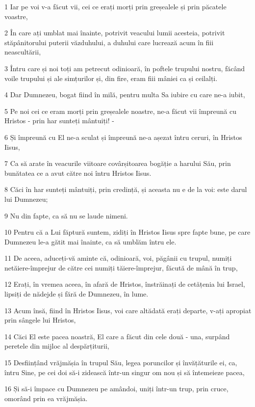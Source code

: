 \par 1 Iar pe voi v-a făcut vii, cei ce erați morți prin greșealele și prin păcatele voastre,
\par 2 În care ați umblat mai înainte, potrivit veacului lumii acesteia, potrivit stăpânitorului puterii văzduhului, a duhului care lucrează acum în fiii neascultării,
\par 3 Întru care și noi toți am petrecut odinioară, în poftele trupului nostru, făcând voile trupului și ale simțurilor și, din fire, eram fiii mâniei ca și ceilalți.
\par 4 Dar Dumnezeu, bogat fiind în milă, pentru multa Sa iubire cu care ne-a iubit,
\par 5 Pe noi cei ce eram morți prin greșealele noastre, ne-a făcut vii împreună cu Hristos - prin har sunteți mântuiți! -
\par 6 Și împreună cu El ne-a sculat și împreună ne-a așezat întru ceruri, în Hristos Iisus,
\par 7 Ca să arate în veacurile viitoare covârșitoarea bogăție a harului Său, prin bunătatea ce a avut către noi întru Hristos Iisus.
\par 8 Căci în har sunteți mântuiți, prin credință, și aceasta nu e de la voi: este darul lui Dumnezeu;
\par 9 Nu din fapte, ca să nu se laude nimeni.
\par 10 Pentru că a Lui făptură suntem, zidiți în Hristos Iisus spre fapte bune, pe care Dumnezeu le-a gătit mai înainte, ca să umblăm întru ele.
\par 11 De aceea, aduceți-vă aminte că, odinioară, voi, păgânii cu trupul, numiți netăiere-împrejur de către cei numiți tăiere-împrejur, făcută de mână în trup,
\par 12 Erați, în vremea aceea, în afară de Hristos, înstrăinați de cetățenia lui Israel, lipsiți de nădejde și fără de Dumnezeu, în lume.
\par 13 Acum însă, fiind în Hristos Iisus, voi care altădată erați departe, v-ați apropiat prin sângele lui Hristos,
\par 14 Căci El este pacea noastră, El care a făcut din cele două - una, surpând peretele din mijloc al despărțiturii,
\par 15 Desființând vrăjmășia în trupul Său, legea poruncilor și învățăturile ei, ca, întru Sine, pe cei doi să-i zidească într-un singur om nou și să întemeieze pacea,
\par 16 Și să-i împace cu Dumnezeu pe amândoi, uniți într-un trup, prin cruce, omorând prin ea vrăjmășia.
